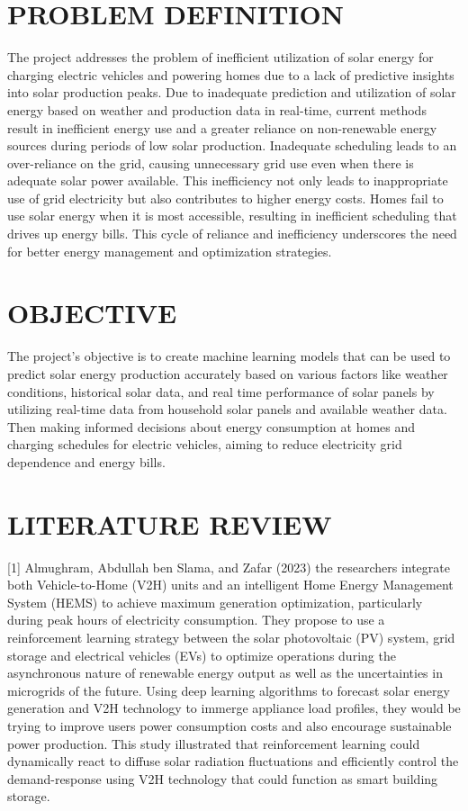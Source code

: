 \documentclass[conference]{IEEEtran}
\begin{document}
\section{PROBLEM DEFINITION}
The project addresses the problem of  inefficient utilization of solar energy for charging electric vehicles and powering homes due to a lack of predictive insights into solar production peaks.  Due to inadequate prediction and utilization of solar energy based on weather and production data in real-time, current methods result in inefficient energy use and a greater reliance on non-renewable energy sources during periods of low solar production.
Inadequate scheduling leads to an over-reliance on the grid, causing unnecessary grid use even when there is adequate solar power available. This inefficiency not only leads to inappropriate use of grid electricity but also contributes to higher energy costs. Homes fail to use solar energy when it is most accessible, resulting in inefficient scheduling that drives up energy bills. This cycle of reliance and inefficiency underscores the need for better energy management and optimization strategies.

\section{OBJECTIVE}
The project's objective is to create machine learning models that can be used to predict solar energy production accurately based on various factors like weather conditions, historical solar data, and real time performance of solar panels by utilizing real-time data from household solar panels and available weather data. 
Then making informed decisions about energy consumption at homes and charging schedules for electric vehicles, aiming to reduce electricity grid dependence and energy bills.

\section{LITERATURE REVIEW}

[1] Almughram, Abdullah ben Slama, and Zafar (2023) the researchers integrate both Vehicle-to-Home (V2H) units and an intelligent Home Energy Management System (HEMS) to achieve maximum generation optimization, particularly during peak hours of electricity consumption. They propose to use a reinforcement learning strategy between the solar photovoltaic (PV) system, grid storage and electrical vehicles (EVs) to optimize operations during the asynchronous nature of renewable energy output as well as the uncertainties in microgrids of the future. Using deep learning algorithms to forecast solar energy generation and V2H technology to immerge appliance load profiles, they would be trying to improve users power consumption costs and also encourage sustainable power production. This study illustrated that reinforcement learning could dynamically react to diffuse solar radiation fluctuations and efficiently control the demand-response using V2H technology that could function as smart building storage.
\end{document}
